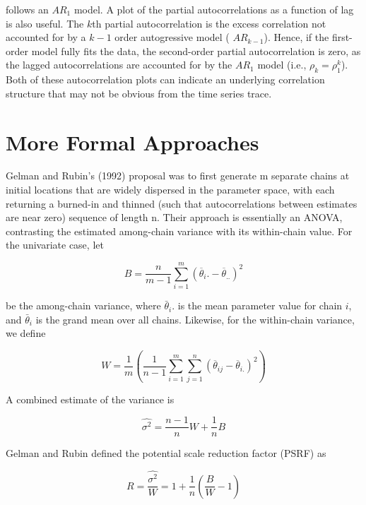 \documentclass{article}
\begin{document}
follows an  $ AR_1 $ model. A plot of the partial autocorrelations as a function of lag is also useful. The  $ k $th partial autocorrelation is the excess correlation not accounted for by a  $ k - 1 $ order autogressive model ( $ AR_{k-1} $). Hence, if the first-order model fully fits the data, the second-order partial autocorrelation is zero, as the lagged autocorrelations are accounted for by the  $ AR_1 $ model (i.e.,  $ \rho_k = \rho_1^k $). Both of these autocorrelation plots can indicate an underlying correlation structure that may not be obvious from the time series trace.

\section{More Formal Approaches}
Gelman and Rubin's (1992) proposal was to first generate m separate chains at initial locations that are widely dispersed in the parameter space, with each returning a burned-in and thinned (such that autocorrelations between estimates are near zero) sequence of length n. Their approach is essentially an ANOVA, contrasting the estimated among-chain variance with its within-chain value. For the univariate case, let

\begin{equation}
B=\frac{n}{m-1}\sum_{i=1}^{m}(\overline{\theta}_{i}.-\overline{\theta}_{..})^{2}
\end{equation}

be the among-chain variance, where  $ \bar{\theta}_i $. is the mean parameter value for chain  $ i $, and  $ \bar{\theta}_i $ is the grand mean over all chains. Likewise, for the within-chain variance, we define

\begin{equation}
W=\frac{1}{m}\left(\frac{1}{n-1}\sum_{i=1}^{m}\sum_{j=1}^{n}(\overline{\theta}_{ij}-\overline{\theta}_{i.})^{2}\right)
\end{equation}

A combined estimate of the variance is

\begin{equation}
\widehat{\sigma^{2}}=\frac{n-1}{n}W+\frac{1}{n}B
\end{equation}

Gelman and Rubin defined the potential scale reduction factor (PSRF) as

\begin{equation}
R=\frac{\widehat{\sigma^{2}}}{W}=1+\frac{1}{n}\left(\frac{B}{W}-1\right)
\end{equation}
\end{document}

